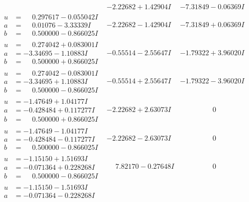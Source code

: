 \documentclass[1p]{elsarticle_modified}
\theoremstyle{definition}
\begin{document}
$$\begin{array}{c|c|c}
 & -2.22682 + 1.42904 I & -7.31849 - 0.06369 I \\ \hline\begin{aligned}
u &= \phantom{-}0.297617 - 0.055042 I \\
a &= \phantom{-}0.01076 - 3.33339 I \\
b &= \phantom{-}0.500000 - 0.866025 I\end{aligned}
 & -2.22682 - 1.42904 I & -7.31849 + 0.06369 I \\ \hline\begin{aligned}
u &= \phantom{-}0.274042 + 0.083001 I \\
a &= -3.34695 - 1.10883 I \\
b &= \phantom{-}0.500000 + 0.866025 I\end{aligned}
 & -0.55514 - 2.55647 I & -1.79322 + 3.96020 I \\ \hline\begin{aligned}
u &= \phantom{-}0.274042 - 0.083001 I \\
a &= -3.34695 + 1.10883 I \\
b &= \phantom{-}0.500000 - 0.866025 I\end{aligned}
 & -0.55514 + 2.55647 I & -1.79322 - 3.96020 I \\ \hline\begin{aligned}
u &= -1.47649 + 1.04177 I \\
a &= -0.428484 + 0.117277 I \\
b &= \phantom{-}0.500000 + 0.866025 I\end{aligned}
 & -2.22682 + 2.63073 I & \phantom{-0.000000 } 0 \\ \hline\begin{aligned}
u &= -1.47649 - 1.04177 I \\
a &= -0.428484 - 0.117277 I \\
b &= \phantom{-}0.500000 - 0.866025 I\end{aligned}
 & -2.22682 - 2.63073 I & \phantom{-0.000000 } 0 \\ \hline\begin{aligned}
u &= -1.15150 + 1.51693 I \\
a &= -0.071364 + 0.228268 I \\
b &= \phantom{-}0.500000 - 0.866025 I\end{aligned}
 & \phantom{-}7.82170 - 0.27648 I & \phantom{-0.000000 } 0 \\ \hline\begin{aligned}
u &= -1.15150 - 1.51693 I \\
a &= -0.071364 - 0.228268 I \\

\end{aligned}
\end{array}$$
\end{document}
